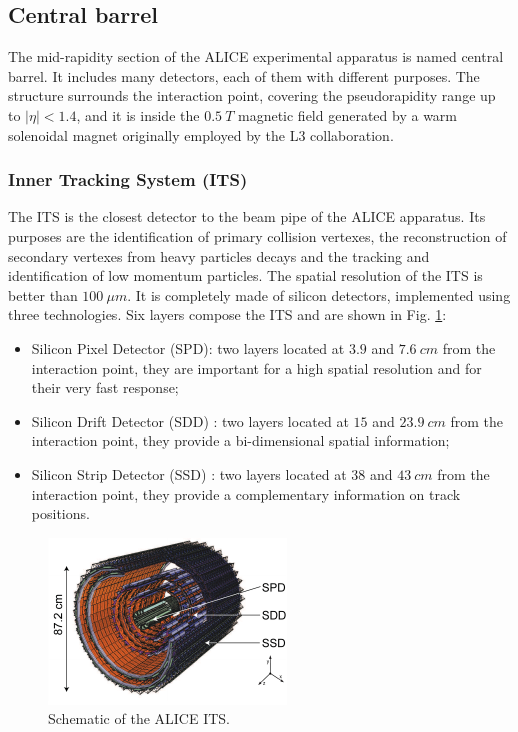 \subsection{Central barrel}
The mid-rapidity section of the ALICE experimental apparatus is named central barrel.
It includes many detectors, each of them with different purposes.
The structure surrounds the interaction point, covering the pseudorapidity range up to $|\eta| < 1.4$, and it is inside the $0.5\ T$ magnetic field generated by a warm solenoidal magnet originally employed by the L3 collaboration.

\subsubsection{Inner Tracking System (ITS)}
The ITS is the closest detector to the beam pipe of the ALICE apparatus.
Its purposes are the identification of primary collision vertexes, the reconstruction of secondary vertexes from heavy particles decays and the tracking and identification of low momentum particles.
The spatial resolution of the ITS is better than $100\ \mu m$.
It is completely made of silicon detectors, implemented using three technologies.
Six layers compose the ITS and are shown in Fig. \ref{fig:ITS}:
\begin{itemize}
    \item Silicon Pixel Detector (SPD): two layers located at $3.9$ and $7.6\ cm$ from the interaction point, they are important for a high spatial resolution and for their very fast response;
    \item Silicon Drift Detector (SDD) : two layers located at $15$ and $23.9\ cm$ from the interaction point, they provide a bi-dimensional spatial information;
    \item Silicon Strip Detector (SSD) : two layers located at $38$ and $43\ cm$ from the interaction point, they provide a complementary information on track positions.
\end{itemize}


\begin{figure}[!h]
\begin{center}
\includegraphics[width=0.7\linewidth]{Chapters/Introduction/Figs/its.pdf}
\caption{Schematic of the ALICE ITS.}
\label{fig:ITS}
\end{center}
\end{figure}

